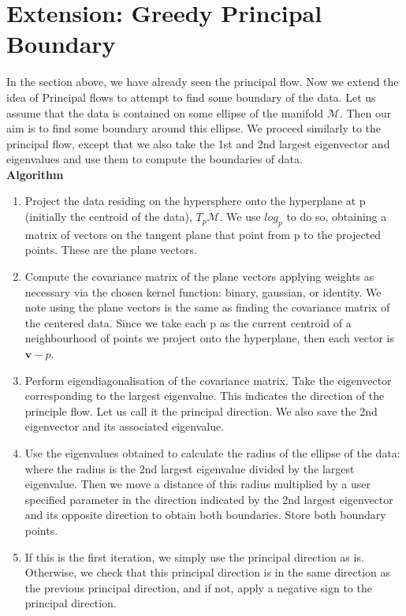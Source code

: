 \documentclass[12pt]{report}
\begin{document}
\section{Extension: Greedy Principal Boundary}
In the section above, we have already seen the principal flow.
Now we extend the idea of Principal flows to attempt to find some boundary of the data.
Let us assume that the data is contained on some ellipse of the manifold
$\mathcal{M}$. Then our aim is to find some boundary around this ellipse. We proceed 
similarly to the principal flow, except that we also take the 1st and 2nd largest eigenvector
and eigenvalues and use them to compute the boundaries of data.\\
\textbf{Algorithm}
\begin{enumerate}
    \item Project the data residing on the hypersphere onto the hyperplane
    at p (initially the centroid of the data), $T_p\mathcal{M}$. We use $log_p$ to do so, 
    obtaining a matrix of vectors on the tangent plane that point from p
    to the projected points. These are the plane vectors.

    \item Compute the covariance matrix of the plane vectors
    applying weights as necessary via the chosen kernel function:
    binary, gaussian, or identity. We note using the plane vectors
    is the same as finding the covariance matrix of the centered data.
    Since we take each p as the current centroid of a neighbourhood of
    points we project onto the hyperplane, then each vector is $\mathbf{v}-p$.

    \item Perform eigendiagonalisation of the covariance matrix. 
    Take the eigenvector corresponding to the largest eigenvalue. 
    This indicates the direction of the principle flow. Let us call it
    the principal direction. We also save the 2nd eigenvector and its associated
    eigenvalue.

    \item Use the eigenvalues obtained to calculate the radius of the
    ellipse of the data: where the radius is the 2nd largest eigenvalue 
    divided by the largest eigenvalue. 
    Then we move a distance of this radius multiplied by 
    a user specified parameter in the direction
    indicated by the 2nd largest eigenvector and its opposite direction to obtain
    both boundaries. Store both boundary points.

    \item If this is the first iteration, we simply use the principal direction
    as is. Otherwise, we check that this principal direction is in the same 
    direction as the previous principal direction, and if not, apply a negative sign
    to the principal direction.


\end{enumerate}
\end{document}
